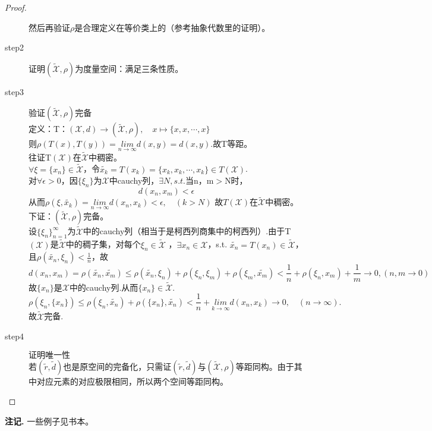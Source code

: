 \documentclass[12pt, a4paper, oneside]{ctexbook}
\newenvironment{note}{\par\noindent\textbf{注记. }}{\par}
\begin{document}
\begin{proof}
\begin{description}
			然后再验证$\rho$是合理定义在等价类上的（参考抽象代数里的证明）。
			\item[step2]
			$\textbf{证明}(\widetilde{\mathscr{X}},\rho)\textbf{为度量空间}$：满足三条性质。
			\item[step3] $\textbf{验证}(\widetilde{\mathscr{X}},\rho)\textbf{完备}$\\
			定义：T：$(\mathscr{X},d) \to (\widetilde{\mathscr{X}},\rho),\quad x \mapsto \{
			x,x,\cdots,x
			\}$\\
			则$\rho(T(x),T(y))=\underset{n\to \infty}{lim}d(x,y)=d(x,y).$故T等距。\\
			往证T$(\mathscr{X})$在$\widetilde{\mathscr{X}}$中稠密。\\
			$\forall \xi =\{
			x_n
			\}\in \widetilde{\mathscr{X}}$，令$\widetilde{x_k}=T(x_k)=\{
			x_k,x_k,\cdots,x_k
			\}\in T(\mathscr{X})$.\\
			对$\forall \epsilon >0$，因$\{\xi_n
			\}$为$\mathscr{X}$中cauchy列，$\exists N,s.t.$当n，m$>$N时，\begin{equation*}
				d(x_n,x_m)<\epsilon
			\end{equation*}
			从而$\rho(\xi,\widetilde{x_k})=\underset{n\to
				\infty}{lim}d(x_n,x_k)<\epsilon,\quad (k>N)$
			故$T(\mathscr{X})$在$\widetilde{\mathscr{X}}$中稠密。\\
			下证：$(\widetilde{\mathscr{X}},\rho)$完备。\\
			设$\{
			\xi_n
			\}^{\infty}_{n=1}$为$\widetilde{\mathscr{X}}$中的cauchy列（相当于是柯西列商集中的柯西列）.由于T$(\mathscr{X})$是$\widetilde{\mathscr{X}}$中的稠子集，对每个$\xi_n
			\in \widetilde{\mathscr{X}} $ ，$\exists x_n \in \mathscr{X}$，s.t.
			$\widetilde{x_n} =T(x_n) \in
			\widetilde{\mathscr{X}}$，且$\rho(\widetilde{x_n},\xi_n)<\frac{1}{n}$，故\begin{equation*}
				d(x_n,x_m)=\rho (\widetilde{x_n},\widetilde{x_m})\leqslant
				\rho(\widetilde{x_n},\xi_n)+\rho(\xi_n,\xi_m)+\rho(\xi_m,\widetilde{x_m})<\frac{1}{n}+\rho(\xi_n,x_m)+\frac{1}{m}\to
				0,(n,m\to 0)
			\end{equation*}
			故$\{x_n\}$是$\mathscr{X}$中的cauchy列.从而$\{x_n\}\in \widetilde{\mathscr{X}}$.
			\begin{equation*}
				\rho(\xi_n,\{x_n\})\leqslant
				\rho(\xi_n,\widetilde{x_n})+\rho(\{x_n\},\widetilde{x_n})<\frac{1}{n}+\underset{k\to
					\infty}{lim}d(x_n,x_k)\to 0,\quad(n\to \infty) .
			\end{equation*}
			故$ \widetilde{\mathscr{X}}$完备.
			\item[step4]$\textbf{证明唯一性}$\\
			若$(\widetilde{r},\widetilde{d})$也是原空间的完备化，只需证$(\widetilde{r},\widetilde{d})$与$(\widetilde{\mathscr{X}},\rho)$等距同构。由于其中对应元素的对应极限相同，所以两个空间等距同构。
		\end{description}
	\end{proof}
	\begin{note}
		一些例子见书本。
	\end{note}
\end{document}
